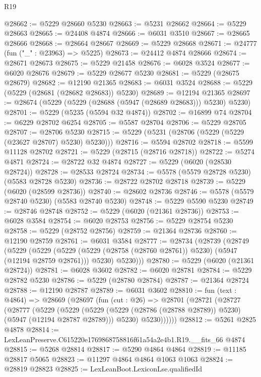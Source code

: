 \begin{lexlean}{R19}
\begin{coremodule}
@28662 := @5229 @28660 @5230
@28663 := @5231 @28662
@28664 := @5229 @28663
@28665 := @24408 @4874
@28666 := @6031 @3510
@28667 := @28665 @28666
@28668 := @28664 @28667
@28669 := @5229 @28668
@28671 := @24777 (fun ("_" : @23963) => @5225)
@28673 := @24412 @4874 @28666
@28674 := @28671 @28673
@28675 := @5229 @21458
@28676 := @6028 @3524
@28677 := @6020 @28676
@28679 := @5229 @28677 @5230
@28681 := @5229 (@28675 @28679)
@28682 := @12190 @21365
@28683 := @6031 @3524
@28688 := @5229 (@5229 (@28681 (@28682 @28683)) @5230)
@28689 := @12194 @21365
@28697 := @28674 (@5229 (@5229 (@28688 (@5947 (@28689 @28683))) @5230) @5230)
@28701 := @5229 (@5235 (@5594 @32 @4874))
@28702 := @16899 @74
@28704 := @6229 @28702 @6254
@28705 := @5587 @28704
@28706 := @5229 @28705
@28707 := @28706 @5230
@28715 := @5229 (@5231 (@28706 (@5229 (@5229 (@23627 @28707) @5230) @5230)))
@28716 := @5594 @28702
@28718 := @5599 @11128 @28702
@28721 := @5229 (@28715 (@28716 @28718))
@28722 := @5274 @4871
@28724 := @28722 @32 @4874
@28727 := @5229 (@6020 (@28530 @28724))
@28728 := @28533 @28724
@28734 := @5578 (@5579 @28728 @5230) (@5583 @28728 @5230)
@28736 := @28722 @28702 @28718
@28739 := @5229 (@6020 (@28599 @28736))
@28740 := @28602 @28736
@28746 := @5578 (@5579 @28740 @5230) (@5583 @28740 @5230)
@28748 := @5229 @5590 @5230
@28749 := @28746 @28748
@28752 := @5229 (@6020 (@21361 @28736))
@28753 := @6028 @3584
@28754 := @6020 @28753
@28756 := @5229 @28754 @5230
@28758 := @5229 (@28752 @28756)
@28759 := @21364 @28736
@28760 := @12190 @28759
@28761 := @6031 @3584
@28777 := @28734
    (@28739
      (@28749
        (@5229
          (@5229
            (@5229 (@5229 (@28758 (@28760 @28761)) @5230) (@5947 (@12194 @28759 @28761)))
            @5230)
          @5230)))
@28780 := @5229 (@6020 (@21361 @28724))
@28781 := @6028 @3602
@28782 := @6020 @28781
@28784 := @5229 @28782 @5230
@28786 := @5229 (@28780 @28784)
@28787 := @21364 @28724
@28788 := @12190 @28787
@28789 := @6031 @3602
@28810 := fun (text : @4864) =>
  @28669
    (@28697
      (fun (cut : @26) =>
      @28701
        (@28721
          (@28727
            (@28777
              (@5229
                (@5229
                  (@5229 (@5229 (@28786 (@28788 @28789)) @5230) (@5947 (@12194 @28787 @28789)))
                  @5230)
                @5230))))))
@28812 := @5261 @2825 @4878
@28814 := LexLeanPreserve.C615220e1769868758816f61a54a2e4b1.R19.__fits_66 @4874
@28815 := @5268 @28814
@28817 := @5290 @4864 @4864
@28819 := @11185 @28817 @5065
@28823 := @11297 @4864 @4864 @1063 @1063
@28824 := @28819 @28823
@28825 := LexLeanBoot.LexiconLse.qualifiedId

\end{coremodule}
\end{lexlean}
